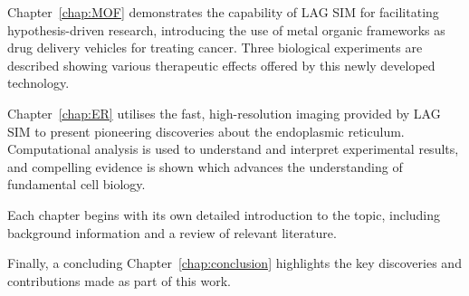Chapter~\ref{chap:MOF} demonstrates the capability of LAG SIM for facilitating hypothesis-driven research, introducing the use of metal organic frameworks as drug delivery vehicles for treating cancer. 
Three biological experiments are described showing various therapeutic effects offered by this newly developed technology. 

Chapter~\ref{chap:ER} utilises the fast, high-resolution imaging provided by LAG SIM to present pioneering discoveries about the endoplasmic reticulum. 
Computational analysis is used to understand and interpret experimental results, and compelling evidence is shown which advances the understanding of fundamental cell biology. 

Each chapter begins with its own detailed introduction to the topic, including background information and a review of relevant literature. 

Finally, a concluding Chapter~\ref{chap:conclusion} highlights the key discoveries and contributions made as part of this work.

